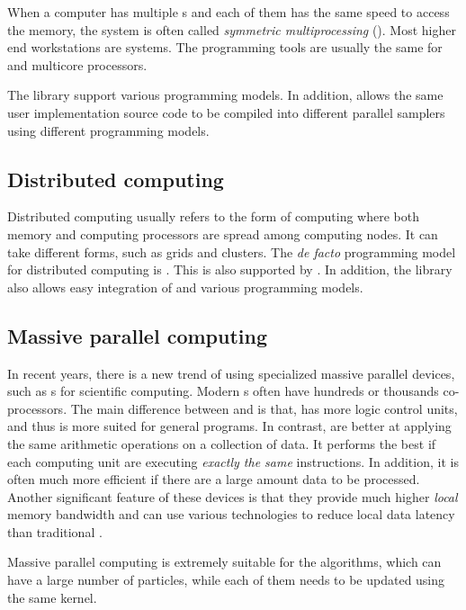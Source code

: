 When a computer has multiple \cpu{}s and each of them has the same speed to access the memory, the system is often called \emph{symmetric multiprocessing} (\smp). Most higher end workstations are \smp systems. The programming tools are usually the same for \smp and multicore processors.

The \vsmc library support various \smp programming models. In addition, \vsmc allows the same user implementation source code to be compiled into different parallel samplers using different programming models.

\subsection{Distributed computing}
\label{sub:Distributed computing}

Distributed computing usually refers to the form of computing where both memory and computing processors are spread among computing nodes. It can take different forms, such as grids and clusters. The \emph{de facto} programming model for distributed computing is \mpi. This is also supported by \vsmc. In addition, the library also allows easy integration of \mpi and various \smp programming models.

\subsection{Massive parallel computing}
\label{sub:Massive parallel computing}

In recent years, there is a new trend of using specialized massive parallel devices, such as \gpu{}s for scientific computing. Modern \gpu{}s often have hundreds or thousands co-processors. The main difference between \gpu and \cpu is that, \cpu has more logic control units, and thus is more suited for general programs. In contrast, \gpu are better at applying the same arithmetic operations on a collection of data. It performs the best if each computing unit are executing \emph{exactly the same} instructions. In addition, it is often much more efficient if there are a large amount data to be processed. Another significant feature of these devices is that they provide much higher \emph{local} memory bandwidth and can use various technologies to reduce local data latency than traditional \cpu.

Massive parallel computing is extremely suitable for the \smc algorithms, which can have a large number of particles, while each of them needs to be updated using the same \mcmc kernel.

